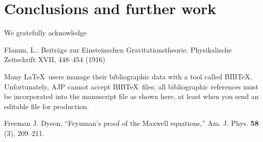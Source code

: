 \documentclass[prb,preprint]{revtex4-1}
\begin{document}
\section{Conclusions and further work}


\begin{acknowledgments}

We gratefully acknowledge 
\end{acknowledgments}


\begin{thebibliography}{99}

 Flamm, L.: Beitr\"{a}ge zur Einsteinschen
  Gravitationstheorie.  Physikalische Zeitschrift XVII, 448–454 (1916)
  
 Many \LaTeX\ users manage their bibliographic data with 
a tool called BIB\TeX.  Unfortunately, AJP cannot accept BIB\TeX\ files; all 
bibliographic references must be incorporated into the manuscript file
as shown here, at least when you send an editable file for production.

 Freeman J. Dyson, ``Feynman's proof of the Maxwell equations,''
Am. J. Phys. \textbf{58} (3), 209--211.  



\end{thebibliography}


\end{document}

